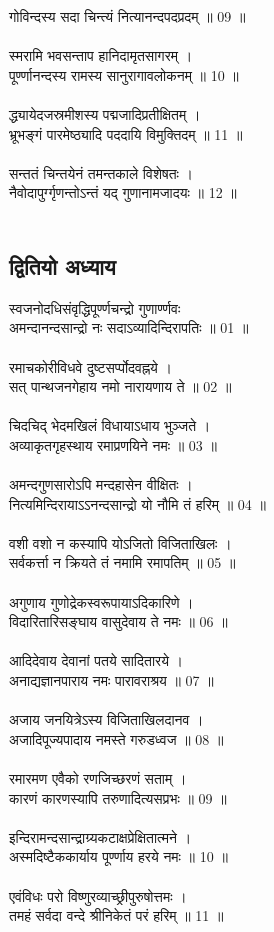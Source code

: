 गोविन्दस्य सदा चिन्त्यं नित्यानन्दपदप्रदम् ॥ 09 ॥\\
\\
 स्मरामि भवसन्ताप हानिदामृतसागरम् ।\\
पूर्ण्णानन्दस्य रामस्य सानुरागावलोकनम्  ॥ 10 ॥\\
\\
द्ध्यायेदजस्रमीशस्य पद्मजादिप्रतीक्षितम् ।\\
भ्रूभङ्गं पारमेष्ठ्यादि पददायि विमुक्तिदम्  ॥ 11 ॥\\
\\
सन्ततं चिन्तयेनं तमन्तकाले विशेषतः ।\\
नैवोदापुर्ग्गृणन्तोऽन्तं यद् गुणानामजादयः ॥ 12 ॥\\
\\
\subsection{\sanskrit द्वितियो अध्याय}
\sanskrit
स्वजनोदधिसंवृद्धिपूर्ण्णचन्द्रो गुणार्ण्णवः\\
अमन्दानन्दसान्द्रो नः सदाऽव्यादिन्दिरापतिः ॥ 01 ॥\\
\\
रमाचकोरीविधवे दुष्टसर्प्पोदवह्नये ।\\
सत् पान्थजनगेहाय नमो नारायणाय ते ॥ 02 ॥\\
\\
चिदचिद् भेदमखिलं विधायाऽधाय भुञ्जते ।\\
अव्याकृतगृहस्थाय रमाप्रणयिने नमः ॥ 03 ॥\\
\\
अमन्दगुणसारोऽपि मन्दहासेन वीक्षितः ।\\
नित्यमिन्दिरायाऽऽनन्दसान्द्रो यो नौमि तं हरिम् ॥ 04 ॥\\
\\
वशी वशो न कस्यापि योऽजितो विजिताखिलः ।\\
सर्वकर्त्ता न क्रियते तं नमामि रमापतिम् ॥ 05 ॥\\
\\
अगुणाय गुणोद्रेकस्वरूपायाऽदिकारिणे ।\\
विदारितारिसङ्घाय वासुदेवाय ते नमः ॥ 06 ॥\\
\\
आदिदेवाय देवानां पतये सादितारये ।\\
अनाद्यज्ञानपाराय नमः पारावराश्रय ॥ 07 ॥\\
\\
अजाय जनयित्रेऽस्य विजिताखिलदानव ।\\
अजादिपूज्यपादाय नमस्ते गरुडध्वज ॥ 08 ॥\\
\\
रमारमण एवैको रणजिच्छरणं सताम् ।\\
कारणं कारणस्यापि तरुणादित्यसप्रभः ॥ 09 ॥\\
\\
 इन्दिरामन्दसान्द्राग्र्यकटाक्षप्रेक्षितात्मने ।\\
अस्मदिष्टैककार्याय पूर्ण्णाय हरये नमः ॥ 10 ॥\\
\\
 एवंविधः परो विष्णुरव्याच्छ्रीपुरुषोत्तमः ।\\
तमहं सर्वदा वन्दे श्रीनिकेतं परं हरिम् ॥ 11 ॥\\
\\
